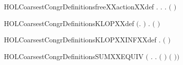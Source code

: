 \newcommand{\HOLCoarsestCongrDate}{06 Settembre 2019}
\newcommand{\HOLCoarsestCongrTime}{11:19}
\begin{SaveVerbatim}{HOLCoarsestCongrDefinitionsfreeXXactionXXdef}
\HOLTokenTurnstile{} \HOLSymConst{\HOLTokenForall{}}.   \HOLSymConst{\HOLTokenEquiv{}} \HOLSymConst{\HOLTokenExists{}}. \HOLSymConst{\HOLTokenForall{}}. \HOLSymConst{\HOLTokenNeg{}}\ensuremath{(} \HOLTokenWeakTransBegin{} \HOLTokenWeakTransEnd {}\ensuremath{)}
\end{SaveVerbatim}
\newcommand{\HOLCoarsestCongrDefinitionsfreeXXactionXXdef}{\UseVerbatim{HOLCoarsestCongrDefinitionsfreeXXactionXXdef}}
\begin{SaveVerbatim}{HOLCoarsestCongrDefinitionsKLOPXXdef}
\HOLTokenTurnstile{} \ensuremath{(}\HOLSymConst{\HOLTokenForall{}}.    \HOLSymConst{\ensuremath{=}} \ensuremath{)} \HOLSymConst{\HOLTokenConj{}}
   \HOLSymConst{\HOLTokenForall{}} .   \ensuremath{(} \ensuremath{)} \HOLSymConst{\ensuremath{=}}    \HOLSymConst{\ensuremath{+}}  \HOLSymConst{\ensuremath{\ldotp}}  
\end{SaveVerbatim}
\newcommand{\HOLCoarsestCongrDefinitionsKLOPXXdef}{\UseVerbatim{HOLCoarsestCongrDefinitionsKLOPXXdef}}
\begin{SaveVerbatim}{HOLCoarsestCongrDefinitionsKLOPXXINFXXdef}
\HOLTokenTurnstile{} \HOLSymConst{\HOLTokenForall{}} .    \HOLSymConst{\ensuremath{=}}   \ensuremath{(}  \HOLSymConst{\ensuremath{+}}  \HOLSymConst{\ensuremath{\ldotp}} \ensuremath{)}
\end{SaveVerbatim}
\newcommand{\HOLCoarsestCongrDefinitionsKLOPXXINFXXdef}{\UseVerbatim{HOLCoarsestCongrDefinitionsKLOPXXINFXXdef}}
\begin{SaveVerbatim}{HOLCoarsestCongrDefinitionsSUMXXEQUIV}
\HOLTokenTurnstile{}  \HOLSymConst{\ensuremath{=}} \ensuremath{(}\HOLTokenLambda{} . \HOLSymConst{\HOLTokenForall{}}.  \ensuremath{(} \HOLSymConst{\ensuremath{+}} \ensuremath{)} \ensuremath{(} \HOLSymConst{\ensuremath{+}} \ensuremath{)}\ensuremath{)}
\end{SaveVerbatim}
